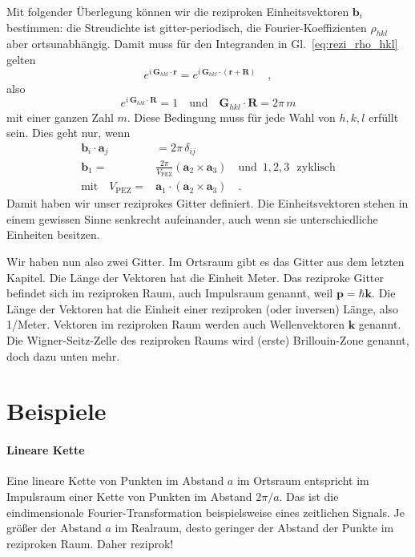 Mit folgender Überlegung können wir die reziproken Einheitsvektoren $\mathbf{b}_i$ bestimmen: die Streudichte ist gitter-periodisch, die Fourier-Koeffizienten $\rho_{hkl}$ aber ortsunabhängig. Damit muss für den Integranden in Gl.~\ref{eq:rezi_rho_hkl} gelten
\begin{equation}
 e^{i \, \mathbf{G}_{hkl} \cdot \mathbf{r}}  =  e^{i \, \mathbf{G}_{hkl} \cdot (\mathbf{r} + \mathbf{R})} \quad ,
\end{equation}
also 
\begin{equation}
 e^{i \, \mathbf{G}_{hkl} \cdot  \mathbf{R}} = 1 \quad \text{und} \quad \mathbf{G}_{hkl} \cdot  \mathbf{R} = 2 \pi \, m
\end{equation}
mit einer ganzen Zahl $m$. Diese Bedingung muss für jede Wahl von $h,k,l$ erfüllt sein. Dies geht nur, wenn
\begin{align}
 \mathbf{b}_i \cdot \mathbf{a}_j & = 2 \pi \, \delta_{ij}  \\
  \mathbf{b}_1 = &\frac{2 \pi}{V_\text{PEZ}} \left(  \mathbf{a}_2 \times \mathbf{a}_3 \right)  \quad \text{und } \, 1,2,3 \, \,\text{ zyklisch} \\
  \text{mit} \quad  V_\text{PEZ} = &  \mathbf{a}_1 \cdot \left(  \mathbf{a}_2   \times \mathbf{a}_3 \right) \quad .
\end{align}
Damit haben wir unser reziprokes Gitter definiert. Die Einheitsvektoren stehen in einem gewissen Sinne senkrecht aufeinander, auch wenn  sie unterschiedliche Einheiten besitzen.


Wir haben nun also zwei Gitter. Im Ortsraum gibt es das Gitter aus dem letzten Kapitel. Die Länge der Vektoren hat die Einheit Meter. Das reziproke Gitter befindet sich im reziproken Raum, auch Impulsraum genannt, weil $\mathbf{p} = \hbar \mathbf{k}$. Die Länge der Vektoren hat die Einheit einer reziproken (oder inversen) Länge, also 1/Meter. Vektoren im reziproken Raum werden auch Wellenvektoren $\mathbf{k}$ genannt. Die Wigner-Seitz-Zelle des reziproken Raums wird (erste) Brillouin-Zone genannt, doch dazu unten mehr.


\section{Beispiele}

\paragraph{Lineare Kette} Eine lineare Kette von Punkten im Abstand $a$ im Ortsraum entspricht im Impulsraum einer Kette von Punkten im Abstand $2 \pi/a$. Das ist die eindimensionale Fourier-Transformation beispielsweise eines zeitlichen Signals. Je größer der Abstand $a$ im Realraum, desto geringer der Abstand der Punkte im reziproken Raum. Daher reziprok!

